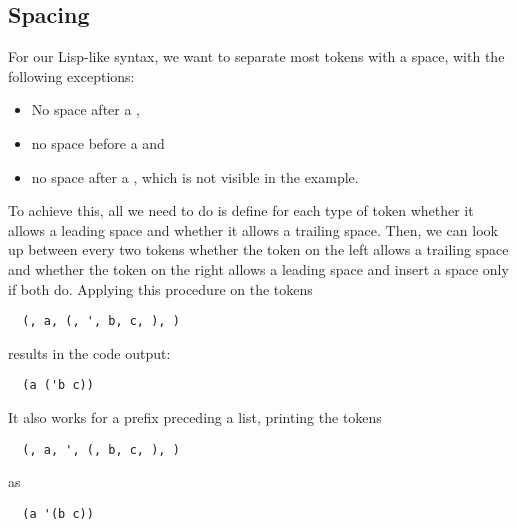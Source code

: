 \subsection{Spacing}
For our Lisp-like syntax, we want to separate most tokens with a space, with the following exceptions:
\begin{itemize}
  \item No space after a ,
  \item no space before a  and
  \item no space after a , which is not visible in the example.
\end{itemize}

To achieve this, all we need to do is define for each type of token
whether it allows a leading space and whether it allows a trailing space.
Then, we can look up between every two tokens
whether the token on the left allows a trailing space and
whether the token on the right allows a leading space and
insert a space only if both do.
Applying this procedure on the tokens
\begin{verbatim}
  (, a, (, ', b, c, ), )
\end{verbatim}
results in the code output:
\begin{verbatim}
  (a ('b c))
\end{verbatim}
It also works for a prefix preceding a list, printing the tokens
\begin{verbatim}
  (, a, ', (, b, c, ), )
\end{verbatim}
as
\begin{verbatim}
  (a '(b c))
\end{verbatim}
